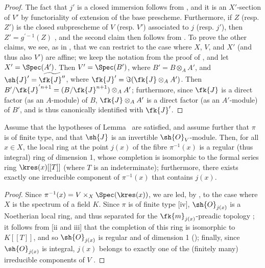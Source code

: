 \begin{proof}
\label{proof-II.8.10.2}
The fact that $j'$ is a closed immersion follows from , and it is an $X'$-section of $V'$ by functoriality of extension of the base prescheme.
Furthermore, if $Z$ (resp. $Z'$) is the closed subprescheme of $V$ (resp. $V'$) associated to $j$ (resp. $j'$), then $Z'=g^{'-1}(Z)$ , and the second claim then follows from .
To prove the other claims, we see, as in , that we can restrict to the case where $X$, $V$, and $X'$ (and thus also $V'$) are affine;
we keep the notation from the proof of , and let $X'=\Spec(A')$.
Then $V'=\Spec(B')$, where $B'=B\otimes_A A'$, and $\sh{J}'=\widetilde{\fk{J}''}$, where $\fk{J}'=\Im(\fk{J}\otimes_A A')$.
Then $B'/\fk{J}^{'n+1}=(B/\fk{J}^{n+1})\otimes_A A'$;
furthermore, since $\fk{J}$ is a direct factor (as an $A$-module) of $B$, $\fk{J}\otimes_A A'$ is a direct factor (as an $A'$-module) of $B'$, and is thus canonically identified with $\fk{J}'$.
\end{proof}

\begin{corollary}[8.10.3]
\label{II.8.10.3}
Assume that the hypotheses of Lemma~ are satisfied, and assume further that $\pi$ is of finite type, and that $\sh{J}$ is an invertible $\sh{O}_V$-module.
Then, for all $x\in X$, the local ring at the point $j(x)$ of the fibre $\pi^{-1}(x)$ is a regular (thus integral) ring of dimension 1, whose completion is isomorphic to the formal series ring $\kres(x)[[T]]$ (where $T$ is an indeterminate);
furthermore, there exists exactly one irreducible component of $\pi^{-1}(x)$ that contains $j(x)$.
\end{corollary}

\begin{proof}
\label{proof-II.8.10.3}
Since $\pi^{-1}(x)=V\times_X\Spec(\kres(x))$, we are led, by , to the case where $X$ is the spectrum of a field $K$.
Since $\pi$ is of finite type [iv], $\sh{O}_{j(x)}$ is a Noetherian local ring, and thus separated for the $\fk{m}_{j(x)}$-preadic topology ;
it follows from [ii and iii] that the completion of this ring is isomorphic to $K[[T]]$, and so $\sh{O}_{j(x)}$ is regular and of dimension 1 (\cite[p.~17-01, th.~1]{I-1});
finally, since $\sh{O}_{j(x)}$ is integral, $j(x)$ belongs to exactly one of the (finitely many) irreducible components of $V$ .
\end{proof}

